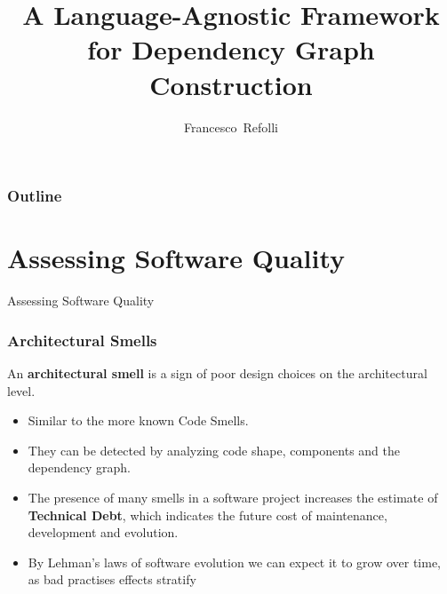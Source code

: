 \documentclass[dvipsnames, 10pt]{beamer}
\date[25 September 2025]{}
\title[TSD Seminary]{A Language-Agnostic Framework for Dependency Graph Construction}
\subtitle{}
\author[Francesco~Refolli]{Francesco~Refolli}
\begin{document}
\frame{\titlepage}

\begin{frame}
\frametitle{Outline}
\tableofcontents
\end{frame}


\section{Assessing Software Quality}
\begin{frame}
  \centering
  \Huge
  Assessing Software Quality
\end{frame}

\begin{frame}
  \frametitle{Architectural Smells}
  \begin{definition}
    An \textbf{architectural smell} is a sign of poor design choices on the architectural level.
  \end{definition}

  \begin{itemize}
    \item Similar to the more known Code Smells.
    \item They can be detected by analyzing code shape, components and the dependency graph.
    \item The presence of many smells in a software project increases the estimate of \textbf{Technical Debt}, which indicates the future cost of maintenance, development and evolution.
    \item By Lehman's laws of software evolution we can expect it to grow over time, as bad practises effects stratify
  \end{itemize}
\end{frame}
\end{document}
